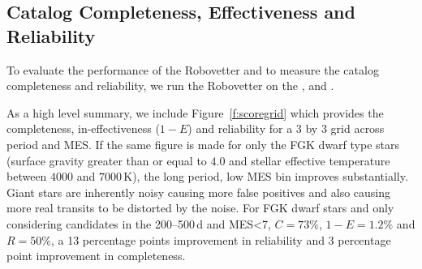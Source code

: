 \subsection{Catalog Completeness, Effectiveness and Reliability}
\label{s:candr}

To evaluate the performance of the Robovetter and to measure the catalog completeness and reliability, we run the Robovetter on the ,  and . 

As a high level summary, we include Figure~\ref{f:scoregrid} which provides the completeness, in-effectiveness ($1-E$) and reliability  for a 3 by 3 grid across period and MES. If the same figure is made for only the FGK dwarf type stars (surface gravity greater than or equal to $4.0$ and stellar effective temperature between $4000$ and $7000$\,K), the long period, low MES bin improves substantially. Giant stars are inherently noisy causing more false positives and also causing more real transits to be distorted by the noise. For FGK dwarf stars and only considering candidates in the 200--500\,d and MES<7, $C=73\%$, $1-E=1.2\%$ and $R=50\%$, a 13 percentage points improvement in reliability and 3 percentage point improvement in completeness. 

